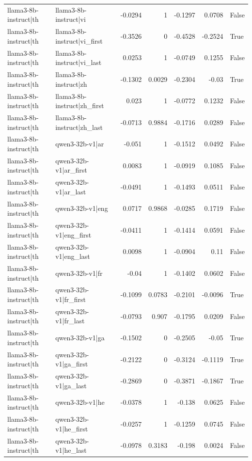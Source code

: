 \begin{table}
\begin{tabular}{l l r r r r l}
llama3-8b-instruct|th & llama3-8b-instruct|vi & -0.0294 & 1 & -0.1297 & 0.0708 & False \\
llama3-8b-instruct|th & llama3-8b-instruct|vi_first & -0.3526 & 0 & -0.4528 & -0.2524 & True \\
llama3-8b-instruct|th & llama3-8b-instruct|vi_last & 0.0253 & 1 & -0.0749 & 0.1255 & False \\
llama3-8b-instruct|th & llama3-8b-instruct|zh & -0.1302 & 0.0029 & -0.2304 & -0.03 & True \\
llama3-8b-instruct|th & llama3-8b-instruct|zh_first & 0.023 & 1 & -0.0772 & 0.1232 & False \\
llama3-8b-instruct|th & llama3-8b-instruct|zh_last & -0.0713 & 0.9884 & -0.1716 & 0.0289 & False \\
llama3-8b-instruct|th & qwen3-32b-v1|ar & -0.051 & 1 & -0.1512 & 0.0492 & False \\
llama3-8b-instruct|th & qwen3-32b-v1|ar_first & 0.0083 & 1 & -0.0919 & 0.1085 & False \\
llama3-8b-instruct|th & qwen3-32b-v1|ar_last & -0.0491 & 1 & -0.1493 & 0.0511 & False \\
llama3-8b-instruct|th & qwen3-32b-v1|eng & 0.0717 & 0.9868 & -0.0285 & 0.1719 & False \\
llama3-8b-instruct|th & qwen3-32b-v1|eng_first & -0.0411 & 1 & -0.1414 & 0.0591 & False \\
llama3-8b-instruct|th & qwen3-32b-v1|eng_last & 0.0098 & 1 & -0.0904 & 0.11 & False \\
llama3-8b-instruct|th & qwen3-32b-v1|fr & -0.04 & 1 & -0.1402 & 0.0602 & False \\
llama3-8b-instruct|th & qwen3-32b-v1|fr_first & -0.1099 & 0.0783 & -0.2101 & -0.0096 & True \\
llama3-8b-instruct|th & qwen3-32b-v1|fr_last & -0.0793 & 0.907 & -0.1795 & 0.0209 & False \\
llama3-8b-instruct|th & qwen3-32b-v1|ga & -0.1502 & 0 & -0.2505 & -0.05 & True \\
llama3-8b-instruct|th & qwen3-32b-v1|ga_first & -0.2122 & 0 & -0.3124 & -0.1119 & True \\
llama3-8b-instruct|th & qwen3-32b-v1|ga_last & -0.2869 & 0 & -0.3871 & -0.1867 & True \\
llama3-8b-instruct|th & qwen3-32b-v1|he & -0.0378 & 1 & -0.138 & 0.0625 & False \\
llama3-8b-instruct|th & qwen3-32b-v1|he_first & -0.0257 & 1 & -0.1259 & 0.0745 & False \\
llama3-8b-instruct|th & qwen3-32b-v1|he_last & -0.0978 & 0.3183 & -0.198 & 0.0024 & False \\

\end{tabular}
\end{table}
